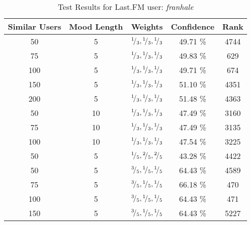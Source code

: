 \begin{table}[h!]
\centering
\begin{tabular}{ | c | c | c || c | c | }
\hline
Similar Users	& Mood Length	& Weights							&Confidence	&Rank\\
\hline \hline
50			& 5			& \({}^{1}\!/_{3}, {}^{1}\!/_{3}, {}^{1}\!/_{3}\)	&49.71 \%		&4744\\
\hline
75			& 5			& \({}^{1}\!/_{3}, {}^{1}\!/_{3}, {}^{1}\!/_{3}\)	&49.83 \%		&629\\
\hline
100			& 5			& \({}^{1}\!/_{3}, {}^{1}\!/_{3}, {}^{1}\!/_{3}\)	&49.71 \%		&674\\
\hline
150			& 5			& \({}^{1}\!/_{3}, {}^{1}\!/_{3}, {}^{1}\!/_{3}\)	&51.10 \%		&4351\\
\hline
200			& 5			& \({}^{1}\!/_{3}, {}^{1}\!/_{3}, {}^{1}\!/_{3}\)	&51.48 \%		&4363\\
\hline
50			& 10			& \({}^{1}\!/_{3}, {}^{1}\!/_{3}, {}^{1}\!/_{3}\)	&47.49 \%		&3160\\
\hline
75			& 10			& \({}^{1}\!/_{3}, {}^{1}\!/_{3}, {}^{1}\!/_{3}\)	&47.49 \%		&3135\\
\hline
100			& 10			& \({}^{1}\!/_{3}, {}^{1}\!/_{3}, {}^{1}\!/_{3}\)	&47.54 \%		&3225\\
\hline
50			& 5			& \({}^{1}\!/_{5}, {}^{2}\!/_{5}, {}^{2}\!/_{5}\)	&43.28 \%		&4422\\
\hline
50			& 5			& \({}^{3}\!/_{5}, {}^{1}\!/_{5}, {}^{1}\!/_{5}\)	&64.43 \%		&4589\\
\hline
75			& 5			& \({}^{3}\!/_{5}, {}^{1}\!/_{5}, {}^{1}\!/_{5}\)	&66.18 \%		&470\\
\hline
100			& 5			& \({}^{3}\!/_{5}, {}^{1}\!/_{5}, {}^{1}\!/_{5}\)	&64.43 \%		&471\\
\hline
150			& 5			& \({}^{3}\!/_{5}, {}^{1}\!/_{5}, {}^{1}\!/_{5}\)	&64.43 \%		&5227\\
\hline
\end{tabular}
\caption{Test Results for Last.FM user: \emph{franhale}}
\label{table:test_results_franhale}
\end{table}

